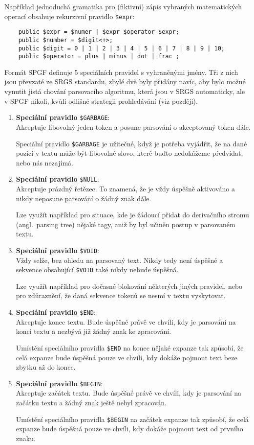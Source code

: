 Například jednoduchá gramatika pro (fiktivní) zápis vybraných matematických operací obsahuje rekurzivní pravidlo \texttt{\$expr}:
\begin{verbatim}
	public $expr = $numer | $expr $operator $expr;
	public $number = $digit<+>;
	public $digit = 0 | 1 | 2 | 3 | 4 | 5 | 6 | 7 | 8 | 9 | 10;
	public $operator = plus | minus | dot | frac ;
\end{verbatim}

Formát SPGF definuje 5 speciálních pravidel s vyhraněnými jmény.
Tři z nich jsou převzaté ze SRGS standardu, zbylé dvě byly přidány navíc, aby bylo možné vynutit jistá chování parsovacího algoritmu,
která jsou v SRGS automaticky, ale v SPGF nikoli, kvůli odlišné strategii prohledávání (viz později).
\begin{enumerate}
	\item \textbf{Speciální pravidlo} \texttt{\$GARBAGE}:\\
	      Akceptuje libovolný jeden token a posune parsování o akceptovaný token dále.

	      Speciální pravidlo \texttt{\$GARBAGE} je užitečné, když je potřeba vyjádřit, že na dané pozici v textu
	      může být libovolné slovo, které buďto nedokážeme předvídat, nebo nás nezajímá.
	\item \textbf{Speciální pravidlo} \texttt{\$NULL}:\\
	      Akceptuje prázdný řetězec.
	      To znamená, že je vždy úspěšně aktivováno a nikdy neposune parsování o žádný znak dále.

	      Lze využít například pro situace, kde je žádoucí přidat do derivačního stromu (angl.~parsing tree) nějaké tagy,
	      aniž by byl učiněn postup v parsovaném textu.
	\item \textbf{Speciální pravidlo} \texttt{\$VOID}:\\
	      Vždy selže, bez ohledu na parsovaný text.
	      Nikdy tedy není úspěšné a sekvence obsahující \texttt{\$VOID} také nikdy nebude úspěšná.

	      Lze využít například pro dočasné blokování některých jiných pravidel, nebo pro zdůraznění,
	      že daná sekvence tokenů se nesmí v textu vyskytovat.
	\item \textbf{Speciální pravidlo} \texttt{\$END}:\\
	      Akceptuje konec textu.
	      Bude úspěšné právě ve chvíli, kdy je parsování na konci textu a nezbývá již žádný znak ke zpracování.

	      Umístění speciálního pravidla \texttt{\$END} na konec nějaké expanze tak způsobí,
	      že celá expanze bude úspěšná pouze ve chvíli, kdy dokáže pojmout text beze zbytku až do konce.
	\item \textbf{Speciální pravidlo} \texttt{\$BEGIN}: \\
	      Akceptuje začátek textu.
	      Bude úspěšné právě ve chvíli, kdy je parsování na začátku textu a žádný znak ještě nebyl zpracován.

	      Umístění speciálního pravidla \texttt{\$BEGIN} na začátek expanze tak způsobí,
	      že celá expanze bude úspěšná pouze ve chvíli, kdy dokáže pojmout text od prvního znaku.
\end{enumerate}

